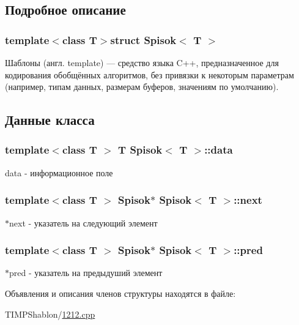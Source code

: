 \subsection{Подробное описание}
\subsubsection*{template$<$class T$>$struct Spisok$<$ T $>$}

Шаблоны (англ. template) — средство языка C++, предназначенное для кодирования обобщённых алгоритмов, без привязки к некоторым параметрам (например, типам данных, размерам буферов, значениям по умолчанию). 

\subsection{Данные класса}
\hypertarget{struct_spisok_aa25d518a0e44cdd1c882051db5af9e04}{}
\subsubsection[{data}]{\setlength{\rightskip}{0pt plus 5cm}template$<$class T $>$ T {\bf Spisok}$<$ T $>$\+::data}\label{struct_spisok_aa25d518a0e44cdd1c882051db5af9e04}


data -\/ информационное поле 

\hypertarget{struct_spisok_a55a474ff28ffad84e395d7a481717832}{}
\subsubsection[{next}]{\setlength{\rightskip}{0pt plus 5cm}template$<$class T $>$ {\bf Spisok}$\ast$ {\bf Spisok}$<$ T $>$\+::next}\label{struct_spisok_a55a474ff28ffad84e395d7a481717832}


$\ast$next -\/ указатель на следующий элемент 

\hypertarget{struct_spisok_a5898c0910b43a9c6e55224bb5fd89416}{}
\subsubsection[{pred}]{\setlength{\rightskip}{0pt plus 5cm}template$<$class T $>$ {\bf Spisok}$\ast$ {\bf Spisok}$<$ T $>$\+::pred}\label{struct_spisok_a5898c0910b43a9c6e55224bb5fd89416}


$\ast$pred -\/ указатель на предыдуший элемент 



Объявления и описания членов структуры находятся в файле\+:\begin{DoxyCompactItemize}
\item 
T\+I\+M\+P\+Shablon/\hyperlink{1212_8cpp}{1212.\+cpp}\end{DoxyCompactItemize}
